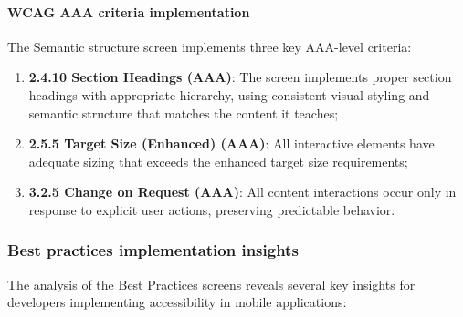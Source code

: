\paragraph{WCAG AAA criteria implementation}

The Semantic structure screen implements three key AAA-level criteria:

\begin{enumerate}
    \item \textbf{2.4.10 Section Headings (AAA)}: The screen implements proper section headings with appropriate hierarchy, using consistent visual styling and semantic structure that matches the content it teaches;
    
    \item \textbf{2.5.5 Target Size (Enhanced) (AAA)}: All interactive elements have adequate sizing that exceeds the enhanced target size requirements;
    
    \item \textbf{3.2.5 Change on Request (AAA)}: All content interactions occur only in response to explicit user actions, preserving predictable behavior.
\end{enumerate}

\subsubsection{Best practices implementation insights}
\label{subsubsec:best-practices-insights}

The analysis of the Best Practices screens reveals several key insights for developers implementing accessibility in mobile applications:

